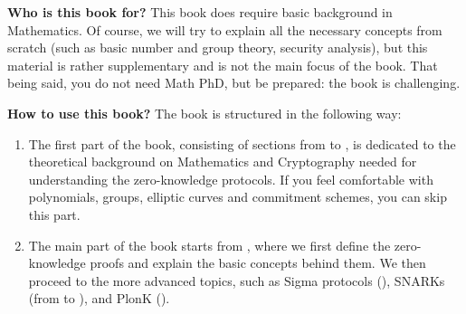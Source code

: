 \documentclass[lecture-notes.tex]{subfiles}
\begin{document}
\textbf{Who is this book for?} This book does require basic background in
Mathematics. Of course, we will try to explain all the necessary concepts from
scratch (such as basic number and group theory, security analysis), but this
material is rather supplementary and is not the main focus of the book. That
being said, you do not need Math PhD, but be prepared: the book is challenging.

\textbf{How to use this book?} The book is structured in the following way:
\begin{enumerate}[left=1mm]
    \item The first part of the book, consisting of sections from
     to , is dedicated to
    the theoretical background on Mathematics and Cryptography needed for
    understanding the zero-knowledge protocols. If you feel comfortable with
    polynomials, groups, elliptic curves and commitment schemes, you can skip
    this part.
    \item The main part of the book starts from , where 
    we first define the zero-knowledge proofs and explain the basic concepts
    behind them. We then proceed to the more advanced topics, such as Sigma
    protocols (), SNARKs (from 
    to ), and PlonK ().
\end{enumerate}
\end{document}
